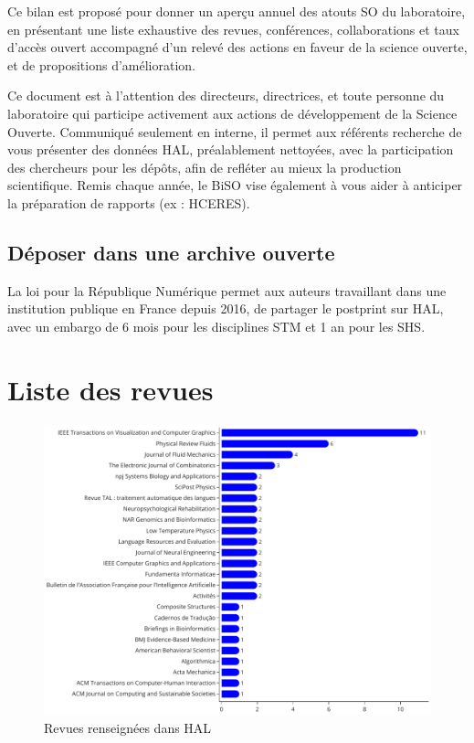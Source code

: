 \documentclass[french, 11pt]{dibiso/biso}
\begin{document}
Ce bilan est proposé pour donner un aperçu annuel des atouts SO du laboratoire, en présentant une liste exhaustive des revues, conférences, collaborations et taux d'accès ouvert accompagné d'un relevé des actions en faveur de la science ouverte, et de propositions d'amélioration.

Ce document est à l'attention des directeurs, directrices, et toute personne du laboratoire qui participe activement aux actions de développement de la Science Ouverte. Communiqué seulement en interne, il permet aux référents recherche de vous présenter des données HAL, préalablement nettoyées, avec la participation des chercheurs pour les dépôts, afin de refléter au mieux la production scientifique. Remis chaque année, le BiSO vise également à vous aider à anticiper la préparation de rapports (ex : HCERES).


\subsection*{Déposer dans une archive ouverte}

La loi pour la République Numérique permet aux auteurs travaillant dans une institution publique en France depuis 2016, de partager le postprint sur HAL, avec un embargo de 6 mois pour les disciplines STM et 1 an pour les SHS.

\pagebreak

\section{Liste des revues}


\begin{figure}[!h]
  \includegraphics[width=\textwidth]{figures/journals_hal.pdf}
  \centering
  \caption{Revues renseignées dans HAL}
  \label{fig_jorunals_hal}
\end{figure}
\end{document}
